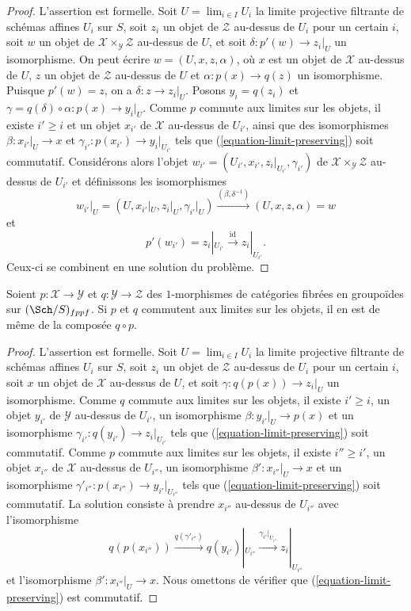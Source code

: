\begin{proof}
L'assertion est formelle. Soit $U = \lim_{i \in I} U_i$ la limite projective filtrante
de schémas affines $U_i$ sur $S$, soit $z_i$ un objet de $\mathcal{Z}$
au-dessus de $U_i$ pour un certain $i$, soit $w$ un objet de
$\mathcal{X} \times_\mathcal{Y} \mathcal{Z}$ au-dessus de $U$, et soit
$\delta : p'(w) \to z_i|_U$ un isomorphisme.
On peut écrire
$w = (U, x, z, \alpha)$, où $x$ est un objet de $\mathcal{X}$ au-dessus de $U$,
$z$ un objet de $\mathcal{Z}$ au-dessus de $U$ et
$\alpha : p(x) \to q(z)$ un isomorphisme. Puisque $p'(w) = z$, on a
$\delta : z \to z_i|_U$. Posons $y_i = q(z_i)$ et
$\gamma = q(\delta) \circ \alpha : p(x) \to y_i|_U$.
Comme $p$ commute aux limites sur les objets, il existe $i' \geq i$
et un objet $x_{i'}$ de $\mathcal{X}$ au-dessus de $U_{i'}$, ainsi que des
isomorphismes $\beta : x_{i'}|_U \to x$ et
$\gamma_{i'} : p(x_{i'}) \to y_i|_{U_{i'}}$ tels que
(\ref{equation-limit-preserving}) soit commutatif. Considérons alors l'objet
$w_{i'} = (U_{i'}, x_{i'}, z_i|_{U_{i'}}, \gamma_{i'})$ de
$\mathcal{X} \times_\mathcal{Y} \mathcal{Z}$ au-dessus de $U_{i'}$
et définissons les isomorphismes
$$
w_{i'}|_U = (U, x_{i'}|_U, z_i|_U, \gamma_{i'}|_U)
\xrightarrow{(\beta, \delta^{-1})}
(U, x, z, \alpha) = w
$$
et
$$
p'(w_{i'}) = z_i|_{U_{i'}} \xrightarrow{\text{id}} z_i|_{U_{i'}}.
$$
Ceux-ci se combinent en une solution du problème.
\end{proof}

\begin{lemma}
\label{lemma-composition-limit-preserving}
Soient $p : \mathcal{X} \to \mathcal{Y}$ et $q : \mathcal{Y} \to \mathcal{Z}$
des $1$-morphismes de catégories fibrées en groupoïdes sur $(\Sch/S)_{fppf}$.
Si $p$ et $q$ commutent aux limites sur les objets, il en est de même de la composée
$q \circ p$.
\end{lemma}

\begin{proof}
L'assertion est formelle. Soit $U = \lim_{i \in I} U_i$ la limite projective filtrante
de schémas affines $U_i$ sur $S$, soit $z_i$ un objet de $\mathcal{Z}$
au-dessus de $U_i$ pour un certain $i$, soit $x$ un objet de $\mathcal{X}$ au-dessus de $U$,
et soit $\gamma : q(p(x)) \to z_i|_U$ un isomorphisme. Comme $q$
commute aux limites sur les objets, il existe $i' \geq i$, un objet
$y_{i'}$ de $\mathcal{Y}$ au-dessus de $U_{i'}$, un isomorphisme
$\beta : y_{i'}|_U \to p(x)$ et un isomorphisme
$\gamma_{i'} : q(y_{i'}) \to z_i|_{U_{i'}}$
tels que (\ref{equation-limit-preserving}) soit commutatif. Comme $p$
commute aux limites sur les objets, il existe $i'' \geq i'$, un objet
$x_{i''}$ de $\mathcal{X}$ au-dessus de $U_{i''}$, un isomorphisme
$\beta' : x_{i''}|_U \to x$ et un isomorphisme
$\gamma'_{i''} : p(x_{i''}) \to y_{i'}|_{U_{i''}}$
tels que (\ref{equation-limit-preserving}) soit commutatif.
La solution consiste à prendre $x_{i''}$ au-dessus de $U_{i''}$ avec l'isomorphisme
$$
q(p(x_{i''})) \xrightarrow{q(\gamma'_{i''})}
q(y_{i'})|_{U_{i''}} \xrightarrow{\gamma_{i'}|_{U_{i''}}}
z_i|_{U_{i''}}
$$
et l'isomorphisme $\beta' : x_{i''}|_U \to x$. Nous omettons de vérifier
que (\ref{equation-limit-preserving}) est commutatif.
\end{proof}

